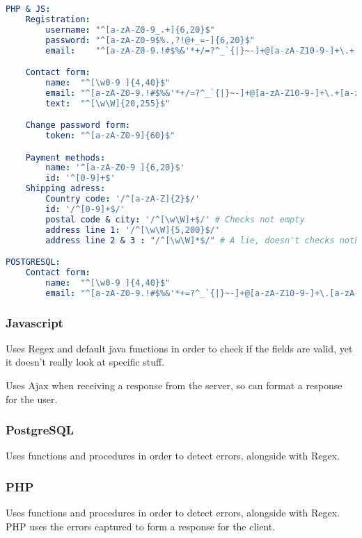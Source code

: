 \begin{lstlisting}[language=yaml,label={lst:regexListing}]
PHP & JS:
    Registration:
        username: "^[a-zA-Z0-9_.+]{6,20}$"
        password: "^[a-zA-Z0-9$%.,?!@+_=-]{6,20}$"
        email:    "^[a-zA-Z0-9.!#$%&'*+/=?^_`{|}~-]+@[a-zA-Z10-9-]+\.+[a-zA-Z0-9-]+$"

    Contact form:
        name:  "^[\w0-9 ]{4,40}$"
        email: "^[a-zA-Z0-9.!#$%&'*+/=?^_`{|}~-]+@[a-zA-Z10-9-]+\.+[a-zA-Z0-9-]+$"
        text:  "^[\w\W]{20,255}$"

    Change password form:
        token: "^[a-zA-Z0-9]{60}$"

    Payment methods:
        name: '^[a-zA-Z0-9 ]{6,20}$'
        id: '^[0-9]+$'
    Shipping adress:
        Country code: '/^[a-zA-Z]{2}$/'
        id: '/^[0-9]+$/'
        postal code & city: '/^[\w\W]+$/' # Checks not empty
        address line 1: '/^[\w\W]{5,200}$/'
        address line 2 & 3 : "/^[\w\W]*$/" # A lie, doesn't checks nothing

POSTGRESQL:
    Contact form:
        name:  "^[\w0-9 ]{4,40}$"
        email: "^[a-zA-Z0-9.!#$%&'*+=?^_`{|}~-]+@[a-zA-Z10-9-]+\.[a-zA-Z0-9-]+$"
\end{lstlisting}

\subsubsection[Javascript]{Javascript}

\begin{flushleft}
    Uses Regex and default java functions in order to check if the fields are valid, yet it doesn't really look at specific stuff.
\end{flushleft}

\begin{flushleft}
    Uses Ajax when receiving a response from the server, so can format a response for the user.
\end{flushleft}

\subsubsection[PostgreSQL]{PostgreSQL}

\begin{flushleft}
    Uses functions and procedures in order to detect errors, alongside with Regex.
\end{flushleft}

\subsubsection[PHP]{PHP}
\begin{flushleft}
    Uses functions and procedures in order to detect errors, alongside with Regex.
    PHP uses the errors captured to form a response for the client.
\end{flushleft}

